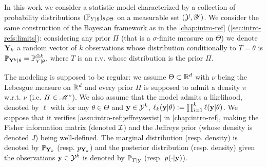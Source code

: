 



In this work we consider a statistic model characterized by a collection of probability distributions $(\mathbb{P}_{Y|\theta})_{\theta\in\Theta}$ on  a measurable set $(\mathcal{Y},\mathscr{Y})$. 
We consider the same construction of the Bayesian framework as in the \cref{chap:intro-ref} (\cref{sec:intro-refs:limits}): considering any prior $\varPi$ (that is a $\sigma$-finite measure on $\Theta$) we denote $\mathbf{Y}_k$ a random vector of $k$ observations whose distribution conditionally to $T=\theta$ is $\mathbb{P}_{\mathbf{Y}^k|\theta}=\mathbb{P}_{Y|\theta}^{\otimes k}$, where $T$ is an r.v. whose distribution is the prior $\varPi$.

The modeling is supposed to be regular: we assume $\Theta\subset\mathbb{R}^d$ with $\nu$ being the Lebesgue measure on $\mathbb{R}^d$ and every prior $\varPi$ is supposed to admit a density $\pi$ w.r.t. $\nu$ (i.e. $\varPi\in\mathscr{M}^\nu$).
We also assume that the model admits a likelihood, denoted by $\ell$ with for any $\theta\in\Theta$ and $\mathbf{y}\in\mathcal{Y}^k$, $\ell_k(\mathbf{y}|\theta):= \prod_{i=1}^k\ell(\mathbf{y}|\theta)$. We suppose that it verifies \cref{assu:intro-ref:jeffreysexist} in \cref{chap:intro-ref}, making the Fisher information matrix (denoted $\mathcal{I}$) and the Jeffreys prior (whose density is denoted $J$) being well-defined.
The marginal distribution (resp. density)  is denoted by $\mathbb{P}_{\mathbf{Y}_k}$ (resp. $p_{\mathbf{Y}_k}$) and the posterior distribution (resp. density) given the observations $\mathbf{y}\in\mathcal{Y}^k$ is denoted by $\mathbb{P}_{T|\mathbf{y}}$ (resp. $p(\cdot|\mathbf{y})$).



